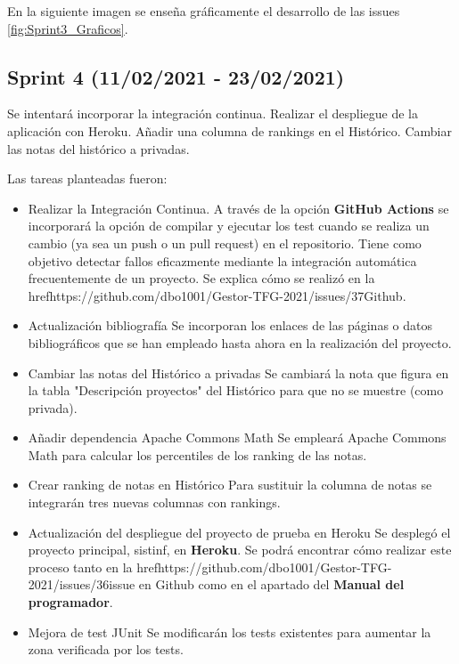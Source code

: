En la siguiente imagen se enseña gráficamente el desarrollo de las issues \ref{fig:Sprint3_Graficos}.


\subsection{Sprint 4 (11/02/2021 - 23/02/2021)}
Se intentará incorporar la integración continua. Realizar el despliegue de la aplicación con Heroku. Añadir una columna de rankings en el Histórico. Cambiar las notas del histórico a privadas.

Las tareas planteadas fueron:
\begin{itemize}
	\tightlist
	\item Realizar la Integración Continua.
		A través de la opción \textbf{GitHub Actions} se incorporará la opción de compilar y ejecutar los test cuando se realiza un cambio (ya sea un push o un pull request) en el repositorio. Tiene como objetivo detectar fallos eficazmente mediante la integración automática frecuentemente de un proyecto. Se explica cómo se realizó en la href{https://github.com/dbo1001/Gestor-TFG-2021/issues/37}{Github}.
	\item Actualización bibliografía
		Se incorporan los enlaces de las páginas o datos bibliográficos que se han empleado hasta ahora en la realización del proyecto.
	\item Cambiar las notas del Histórico a privadas
		Se cambiará la nota que figura en la tabla "Descripción proyectos" del Histórico para que no se muestre (como privada).
	\item Añadir dependencia Apache Commons Math
		Se empleará Apache Commons Math para calcular los percentiles de los ranking de las notas.
	\item Crear ranking de notas en Histórico
		Para sustituir la columna de notas se integrarán tres nuevas columnas con rankings.
	\item Actualización del despliegue del proyecto de prueba en Heroku 
		Se desplegó el proyecto principal, sistinf, en \textbf{Heroku}. Se podrá encontrar cómo realizar este proceso tanto en la href{https://github.com/dbo1001/Gestor-TFG-2021/issues/36}{issue en Github} como en el apartado del \textbf{Manual del programador}.
	\item Mejora de test JUnit
		Se modificarán los tests existentes para aumentar la zona verificada por los tests.
	
\end{itemize}

